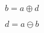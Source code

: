 \documentclass{article}
\begin{document}
$ b = a \oplus d $
\pagebreak

$ d = a \ominus b $
\pagebreak
\end{document}

